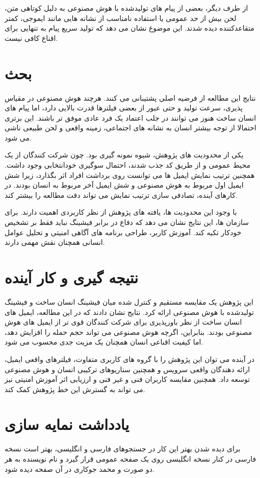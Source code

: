 \documentclass[10pt,twocolumn]{article}
\begin{document}
از طرف دیگر، بعضی از پیام های تولیدشده با هوش مصنوعی به دلیل کوتاهی متن، لحن بیش از حد عمومی یا استفاده نامناسب از نشانه هایی مانند ایموجی، کمتر متقاعدکننده دیده شدند. این موضوع نشان می دهد که تولید سریع پیام به تنهایی برای اقناع کافی نیست.

\section{بحث}
نتایج این مطالعه از فرضیه اصلی پشتیبانی می کنند. هرچند هوش مصنوعی در مقیاس پذیری، سرعت تولید و حتی عبور از بعضی فیلترها قدرت بالایی دارد، اما پیام های انسان ساخت هنوز می توانند در جلب اعتماد یک فرد عادی موفق تر باشند. این برتری احتمالا از توجه بیشتر انسان به نشانه های اجتماعی، زمینه واقعی و لحن طبیعی ناشی می شود.

یکی از محدودیت های پژوهش، شیوه نمونه گیری بود. چون شرکت کنندگان از یک محیط عمومی و از طریق کد  جذب شدند، احتمال سوگیری خودانتخابی وجود داشت. همچنین ترتیب نمایش ایمیل ها می توانست روی برداشت افراد اثر بگذارد، زیرا شش ایمیل اول مربوط به هوش مصنوعی و شش ایمیل آخر مربوط به انسان بودند. در کارهای آینده، تصادفی سازی ترتیب نمایش می تواند دقت مطالعه را بیشتر کند.

با وجود این محدودیت ها، یافته های پژوهش از نظر کاربردی اهمیت دارند. برای سازمان ها، این نتایج نشان می دهد که دفاع در برابر فیشینگ نباید فقط بر تشخیص خودکار تکیه کند. آموزش کاربر، طراحی برنامه های آگاهی امنیتی و تحلیل عوامل انسانی همچنان نقش مهمی دارند.

\section{نتیجه گیری و کار آینده}
این پژوهش یک مقایسه مستقیم و کنترل شده میان فیشینگ انسان ساخت و فیشینگ تولیدشده با هوش مصنوعی ارائه کرد. نتایج نشان دادند که در این مطالعه، ایمیل های انسان ساخت از نظر باورپذیری برای شرکت کنندگان قوی تر از ایمیل های هوش مصنوعی بودند. بنابراین، اگرچه هوش مصنوعی می تواند حجم حمله را افزایش دهد، اما کیفیت اقناعی انسان همچنان یک مزیت جدی محسوب می شود.

در آینده می توان این پژوهش را با گروه های کاربری متفاوت، فیلترهای واقعی ایمیل، ارائه دهندگان واقعی سرویس و همچنین سناریوهای ترکیبی انسان و هوش مصنوعی توسعه داد. همچنین مقایسه کاربران فنی و غیر فنی و ارزیابی اثر آموزش امنیتی نیز می تواند به گسترش این خط پژوهش کمک کند.

\section*{یادداشت نمایه سازی}
برای دیده شدن بهتر این کار در جستجوهای فارسی و انگلیسی، بهتر است نسخه فارسی در کنار نسخه انگلیسی روی یک صفحه عمومی قرار گیرد و نام نویسنده به هر دو صورت  و محمد جوکاری در آن صفحه دیده شود.
\end{document}
